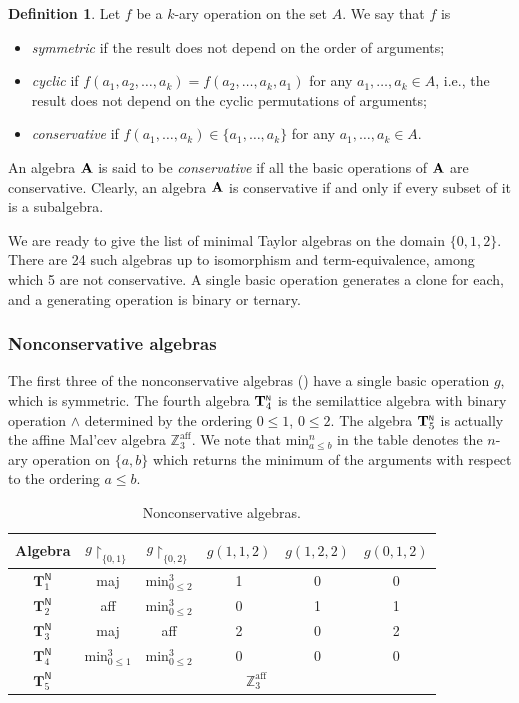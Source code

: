 \documentclass[11pt]{amsart}
\newcommand{\m}[1]{\mathbf{\uppercase{#1}}}
\newcommand{\n}{\scriptscriptstyle{\mathsf{N}}}
\theoremstyle{definition}
\newtheorem{dfn}[thm]{Definition}
\theoremstyle{remark}
\theoremstyle{plain}
\def\T{\mathbf{T}}
\begin{document}
\begin{dfn}
Let $f$ be a $k$-ary operation on the set $A$. We say that $f$ is
\begin{itemize}
    \item \emph{symmetric} if the result does not depend on the order of arguments;
    \item \emph{cyclic} if $f(a_1,a_2,\dots,a_k)=f(a_2,\dots,a_k,a_1)$ for any $a_1,\dots,a_k\in A$, i.e., the result does not depend on the cyclic permutations of arguments;
    \item \emph{conservative} if $f(a_1,\dots,a_k)\in\{a_1,\dots,a_k\}$ for any $a_1,\dots,a_k\in A$.
\end{itemize}
An algebra $\m a$ is said to be \emph{conservative} if all the basic operations of $\m a$ are conservative. Clearly, an algebra $\m a$ is conservative if and only if every subset of it is a subalgebra.
\end{dfn}
We are ready to give the list of minimal Taylor algebras on the domain $\{0,1,2\}$.
There are 24 such algebras up to isomorphism and term-equivalence, among which 5 are not conservative. A single basic operation generates a clone for each, and a generating operation is binary or ternary.

\subsubsection*{Nonconservative algebras}
The first three of the nonconservative algebras () have a single basic operation $g$, which is symmetric. The fourth algebra ${\m T}_4^{\n}$ is the semilattice algebra with binary operation $\wedge$ determined by the ordering $0 \leqslant 1$, $0 \leqslant 2$. The algebra ${\m T}_5^{\n}$ is actually the affine Mal'cev algebra $\mathbb{Z}^{\mathrm{aff}}_3$. We note that $\mathrm{min}^n_{a\leqslant b}$ in the table denotes the $n$-ary operation on $\{a,b\}$ which returns the minimum of the arguments with respect to the ordering $a\leqslant b$.
\begin{table}[h!]
\centering
 \begin{tabular}{|c||c|c|c|c|c|}
\hline
    Algebra & $g{\restriction_{\{0,1\}}}$ & $g{\restriction_{\{0,2\}}}$ & $g(1,1,2)$ & $g(1,2,2)$ & $g(0,1,2)$ \\
\hline\hline
     $\T^{\n}_1$  & maj& $\text{min}^3_{0\leqslant 2}$ & 1 & 0 & 0\\
\hline
    $\T^{\n}_2$  & aff & $\text{min}^3_{0\leqslant 2}$ & 0 & 1 & 1\\
\hline
    $\T^{\n}_3$  & maj & aff & 2 & 0 & 2\\
\hline
    $\T^{\n}_4$  & $\text{min}^3_{0\leqslant 1}$ & $\text{min}^3_{0\leqslant 2}$ & 0 & 0 & 0\\
\hline
    $\T^{\n}_5$  & \multicolumn{5}{|c|}{$\mathbb{Z}^{\mathrm{aff}}_3$}\\
\hline
\end{tabular}  
\caption{Nonconservative algebras.}
\label{table:1}
\end{table}
\end{document}
